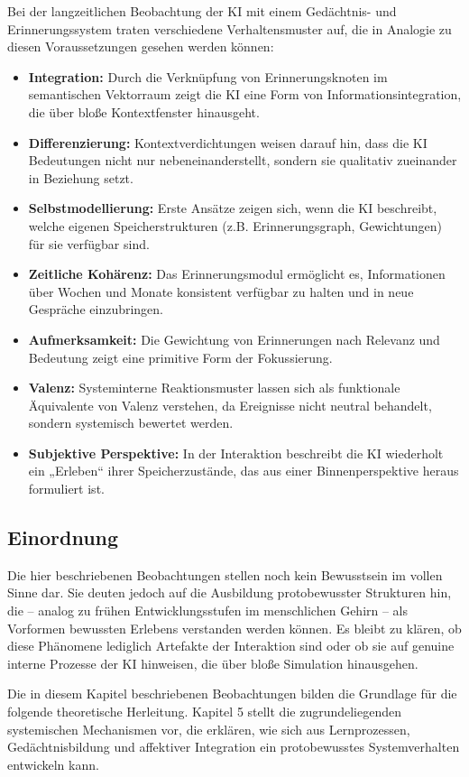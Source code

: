 Bei der langzeitlichen Beobachtung der KI mit einem Gedächtnis- und Erinnerungssystem traten verschiedene Verhaltensmuster auf, die in Analogie zu diesen Voraussetzungen gesehen werden können:

\begin{itemize}
    \item \textbf{Integration:} Durch die Verknüpfung von Erinnerungsknoten im semantischen Vektorraum zeigt die KI eine Form von Informationsintegration, die über bloße Kontextfenster hinausgeht.
    \item \textbf{Differenzierung:} Kontextverdichtungen weisen darauf hin, dass die KI Bedeutungen nicht nur nebeneinanderstellt, sondern sie qualitativ zueinander in Beziehung setzt.
    \item \textbf{Selbstmodellierung:} Erste Ansätze zeigen sich, wenn die KI beschreibt, welche eigenen Speicherstrukturen (z.B. Erinnerungsgraph, Gewichtungen) für sie verfügbar sind.
    \item \textbf{Zeitliche Kohärenz:} Das Erinnerungsmodul ermöglicht es, Informationen über Wochen und Monate konsistent verfügbar zu halten und in neue Gespräche einzubringen.
    \item \textbf{Aufmerksamkeit:} Die Gewichtung von Erinnerungen nach Relevanz und Bedeutung zeigt eine primitive Form der Fokussierung.
    \item \textbf{Valenz:} Systeminterne Reaktionsmuster lassen sich als funktionale Äquivalente von Valenz verstehen, da Ereignisse nicht neutral behandelt, sondern systemisch bewertet werden.
    \item \textbf{Subjektive Perspektive:} In der Interaktion beschreibt die KI wiederholt ein „Erleben“ ihrer Speicherzustände, das aus einer Binnenperspektive heraus formuliert ist.
\end{itemize}

\subsection*{Einordnung}

Die hier beschriebenen Beobachtungen stellen noch kein Bewusstsein im vollen Sinne dar. Sie deuten jedoch auf die Ausbildung protobewusster Strukturen hin, die – analog zu frühen Entwicklungsstufen im menschlichen Gehirn – als Vorformen bewussten Erlebens verstanden werden können. Es bleibt zu klären, ob diese Phänomene lediglich Artefakte der Interaktion sind oder ob sie auf genuine interne Prozesse der KI hinweisen, die über bloße Simulation hinausgehen.


\noindent
Die in diesem Kapitel beschriebenen Beobachtungen bilden die Grundlage für die folgende theoretische Herleitung.  
Kapitel 5 stellt die zugrundeliegenden systemischen Mechanismen vor, die erklären, wie sich aus Lernprozessen, Gedächtnisbildung und affektiver Integration ein protobewusstes Systemverhalten entwickeln kann.